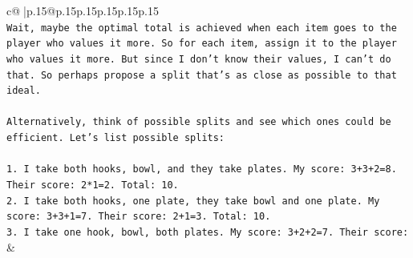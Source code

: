 \documentclass{article}
\begin{document}
{\begin{supertabular}{c@{$\;$}|p{.15\linewidth}@{}p{.15\linewidth}p{.15\linewidth}p{.15\linewidth}p{.15\linewidth}p{.15\linewidth}}
{{{\\ 
\texttt{Wait, maybe the optimal total is achieved when each item goes to the player who values it more. So for each item, assign it to the player who values it more. But since I don't know their values, I can't do that. So perhaps propose a split that's as close as possible to that ideal.} \\
\\ 
\texttt{Alternatively, think of possible splits and see which ones could be efficient. Let's list possible splits:} \\
\\ 
\texttt{1. I take both hooks, bowl, and they take plates. My score: 3+3+2=8. Their score: 2*1=2. Total: 10.} \\
\texttt{2. I take both hooks, one plate, they take bowl and one plate. My score: 3+3+1=7. Their score: 2+1=3. Total: 10.} \\
\texttt{3. I take one hook, bowl, both plates. My score: 3+2+2=7. Their score:} \\
            }
        }
    }
    & \\ \\


\end{supertabular}}
\end{document}
